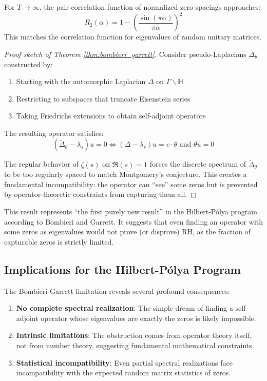 \begin{conjecture}
For $T \to \infty$, the pair correlation function of normalized zero spacings approaches:
$$R_2(\alpha) = 1 - \left(\frac{\sin(\pi \alpha)}{\pi \alpha}\right)^2$$
This matches the correlation function for eigenvalues of random unitary matrices.
\end{conjecture}

\begin{proof}[Proof sketch of Theorem \ref{thm:bombieri_garrett}]
Consider pseudo-Laplacians $\tilde{\Delta}_\theta$ constructed by:
\begin{enumerate}
\item Starting with the automorphic Laplacian $\Delta$ on $\Gamma \backslash \mathbb{H}$
\item Restricting to subspaces that truncate Eisenstein series
\item Taking Friedrichs extensions to obtain self-adjoint operators
\end{enumerate}

The resulting operator satisfies:
$$(\tilde{\Delta}_\theta - \lambda_s)u = 0 \iff (\Delta - \lambda_s)u = c \cdot \theta \text{ and } \theta u = 0$$

The regular behavior of $\zeta(s)$ on $\Re(s) = 1$ forces the discrete spectrum of $\tilde{\Delta}_\theta$ to be too regularly spaced to match Montgomery's conjecture. This creates a fundamental incompatibility: the operator can ``see'' some zeros but is prevented by operator-theoretic constraints from capturing them all.
\end{proof}

\begin{remark}
This result represents ``the first purely new result'' in the Hilbert-P\'olya program according to Bombieri and Garrett. It suggests that even finding an operator with some zeros as eigenvalues would not prove (or disprove) RH, as the fraction of capturable zeros is strictly limited.
\end{remark}

\subsection{Implications for the Hilbert-P\'olya Program}

The Bombieri-Garrett limitation reveals several profound consequences:

\begin{enumerate}
\item \textbf{No complete spectral realization}: The simple dream of finding a self-adjoint operator whose eigenvalues are exactly the zeros is likely impossible.

\item \textbf{Intrinsic limitations}: The obstruction comes from operator theory itself, not from number theory, suggesting fundamental mathematical constraints.

\item \textbf{Statistical incompatibility}: Even partial spectral realizations face incompatibility with the expected random matrix statistics of zeros.
\end{enumerate}

